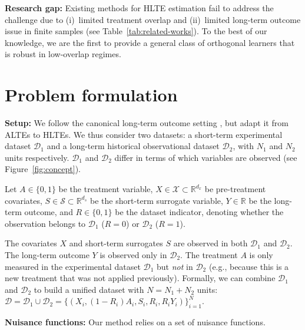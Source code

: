 \documentclass{article}
\theoremstyle{plain}
\theoremstyle{definition}
\theoremstyle{remark}
\newcommand{\1}{\mathds{1}}                %
\newcommand{\methods}{LT-O-learners\xspace}
\begin{document}
\textbf{Research gap:} Existing methods for HLTE estimation fail to address the challenge due to (i)~limited treatment overlap and (ii)~limited long-term outcome issue in finite samples (see Table~\ref{tab:related-works}). To the best of our knowledge, we are the first to provide a general class of orthogonal learners that is robust in low-overlap regimes. 

\vspace{-0.2cm}

\section{Problem formulation} 
\label{sec:formulation}

\textbf{Setup:} We follow the canonical long-term outcome setting \citet{Athey.2025, Chen.2023}, but adapt it from ALTEs to HLTEs. We thus consider two datasets: a short-term experimental dataset $\mathcal{D}_1$ and a long-term historical observational dataset $\mathcal{D}_2$, with $N_1$ and $N_2$ units respectively.  $\mathcal{D}_1$ and $\mathcal{D}_2$ differ in terms of which variables are observed (see Figure~\ref{fig:concept}). 

Let $A \in \{0,1\}$ be the treatment variable, $X\in \mathcal{X}\subset\mathbb{R}^{d_x}$ be pre-treatment covariates, $S \in \mathcal{S}\subset \mathbb{R}^{d_s}$ be the short-term surrogate variable, $Y\in\mathbb{R}$ be the long-term outcome, and $R \in \{0,1\}$ be the dataset indicator, denoting whether the observation belongs to $\mathcal{D}_1$ ($R=0$) or $\mathcal{D}_2$ ($R=1$).

The covariates $X$ and short-term surrogates $S$ are observed in both $\mathcal{D}_1$ and $\mathcal{D}_2$. The long-term outcome $Y$ is observed only in $\mathcal{D}_2$. The treatment $A$ is only measured in the experimental dataset $\mathcal{D}_1$ but \textit{not} in $\mathcal{D}_2$ (e.g., because this is a new treatment that was not applied previously). Formally, we can combine $\mathcal{D}_1$ and $\mathcal{D}_2$ to build a unified dataset with $N=N_1+N_2$ units:
$%
    \mathcal{D}=\mathcal{D}_1 \cup \mathcal{D}_2=\{(X_i, (1 - R_i)A_i, S_i, R_i, R_iY_i)\}_{i=1}^N$.

\textbf{Nuisance functions:} Our method relies on a set of nuisance functions. %
\end{document}
